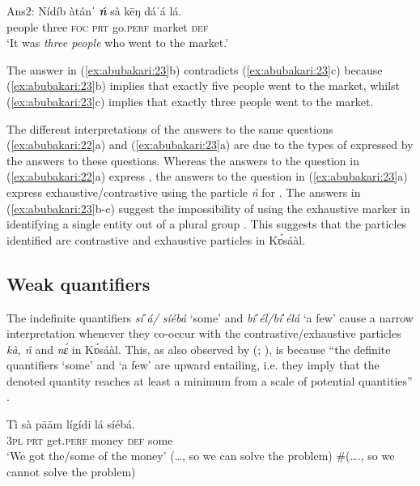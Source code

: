 \documentclass[output=paper
,newtxmath
,modfonts
,nonflat]{langsci/langscibook}
\begin{document}
\ex\label{ex:abubakari:23b}
Ans2: \gll Nídíb  àtánˈ \textbf{\textit{ń} } sà  k\={e}ŋ dáˈá  lá. \\                                                 
people  three  \textsc{foc}  \textsc{prt}       go.\textsc{perf}  market  \textsc{def}\\
\glt ‘It was \textit{three people} who went to the market.’
\z 
\z

The answer in (\ref{ex:abubakari:23}b) contradicts (\ref{ex:abubakari:23}c) because (\ref{ex:abubakari:23}b) implies that exactly five people went to the market, whilst (\ref{ex:abubakari:23}c) implies that exactly three people went to the market. 

The different interpretations of the answers to the same questions (\ref{ex:abubakari:22}a) and (\ref{ex:abubakari:23}a) are due to the types of  expressed by the answers to these questions. Whereas the answers to the question in (\ref{ex:abubakari:22}a) express , the answers to the question in (\ref{ex:abubakari:23}a) express exhaustive/contrastive  using the particle \textit{ń} for  . The answers in (\ref{ex:abubakari:23}b-c) suggest the impossibility of using the exhaustive  marker in identifying a single entity out of a plural group \citep[253]{hartmann2007}. This suggests that the particles identified are contrastive and exhaustive  particles in Kʋ́sáàl. 

\subsection{Weak quantifiers}

The indefinite quantifiers \textit{síˈá/ síébá} ‘some’ and \textit{bíˈél/bíˈélá} ‘a few’ cause a narrow  interpretation whenever they co-occur with the contrastive/exhaustive  particles \textit{kà, ń} and \textit{nɛ́} in Kʋ́sáàl. This, as also observed by \citeauthor{Skopeteas2010} (\citeyear[1387]{Skopeteas2010}; \citealt[cf][]{vanderWal2013}), is because “the definite quantifiers ‘some’ and ‘a few’ are upward entailing, i.e. they imply that the denoted quantity reaches at least a minimum from a scale of potential quantities” \citep[cf][15]{vanderWal2013}.
 
\ea\label{ex:abubakari:24} 
\gll Tì  sà  pāām    lígídi    lá  síébá.\\
3\textsc{pl}  \textsc{prt}  get.\textsc{perf}  money  \textsc{def}  some\\
\glt ‘We got the/some of the money’
\glt (…, so we can solve the problem)
\glt \#(…., so we cannot solve the problem)
\z
\end{document}
